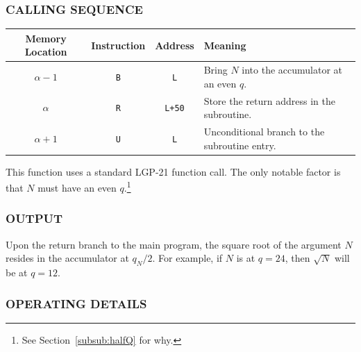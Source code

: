\subsubsection*{CALLING SEQUENCE}
\begin{table}[h!]
\centering
\begin{tabularx}{\textwidth}{cccX}
\toprule
\textbf{Memory Location} & \textbf{Instruction} & \textbf{Address} & \textbf{Meaning} \\
\midrule
$\alpha-1$ & \texttt{B} & \texttt{L} & Bring $N$ into the accumulator at an even $q$. \\
$\alpha$ & \texttt{R} & \texttt{L+50} & Store the return address in the subroutine. \\
$\alpha+1$ & \texttt{U} & \texttt{L} & Unconditional branch to the subroutine entry. \\
\bottomrule
\end{tabularx}
\end{table}

This function uses a standard LGP-21 function call. The only notable factor is that $N$ must have an even $q$.\footnote{See Section~\ref{subsub:halfQ} for why.}

\subsubsection*{OUTPUT}
Upon the return branch to the main program, the square root of the argument $N$ resides in the accumulator at $q_N / 2$. For example, if $N$ is at $q=24$, then $\sqrt{N}$ will be at $q=12$.

\subsubsection*{OPERATING DETAILS}

